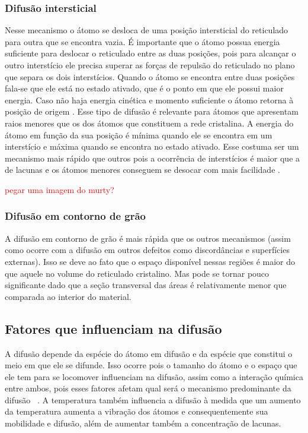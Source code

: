 \documentclass[]{politex}
\newcommand\myworries[1]{\textcolor{red}{#1}}
\begin{document}
\subsubsection{Difusão intersticial}
	Nesse mecanismo o átomo se desloca de uma posição intersticial do reticulado para outra que se encontra vazia. É importante que o átomo possua energia suficiente para deslocar o reticulado entre as duas posições, pois para alcançar o outro interstício ele precisa superar as forças de repulsão do reticulado no plano que separa os dois interstícios. Quando o átomo se encontra entre duas posições fala-se que ele está no estado ativado, que é o ponto em que ele possui maior energia. Caso não haja energia cinética e momento suficiente o átomo retorna à posição de origem \cite{glicksman2000diffusion}. 
	Esse tipo de difusão é relevante para átomos que apresentam raios menores que os dos átomos que constituem a rede cristalina. A energia do átomo em função da sua posição é mínima quando ele se encontra em um interstício e máxima quando se encontra no estado ativado. Esse costuma ser um mecanismo mais rápido que outros pois a ocorrência de interstícios é maior que a de lacunas e os átomos menores conseguem se desocar com mais facilidade \cite{murty2013introduction}.
	
\myworries {pegar uma imagem do murty?}
	
\subsubsection{Difusão em contorno de grão}
A difusão em contorno de grão é mais rápida que os outros mecanismos (assim como ocorre com a difusão em outros defeitos como discordâncias e superfícies externas). Isso se deve ao fato que o espaço disponível nessas regiões é maior do que aquele no volume do reticulado cristalino. Mas pode se tornar pouco significante dado que a seção transversal das áreas é relativamente menor que comparada ao interior do material. 

\subsection{Fatores que influenciam na difusão}
	A difusão depende da espécie do átomo em difusão e da espécie que constitui o meio em que ele se difunde. Isso ocorre pois o tamanho do átomo e o espaço que ele tem para se locomover influenciam na difusão, assim como a interação química entre ambos, pois esses fatores afetam qual será o mecanismo predominante da difusão ~\cite{callister2007materials}. A temperatura também influencia a difusão à medida que um aumento da temperatura aumenta a vibração dos átomos e consequentemente sua mobilidade e difusão, além de aumentar também a concentração de lacunas. 
	
\end{document}
